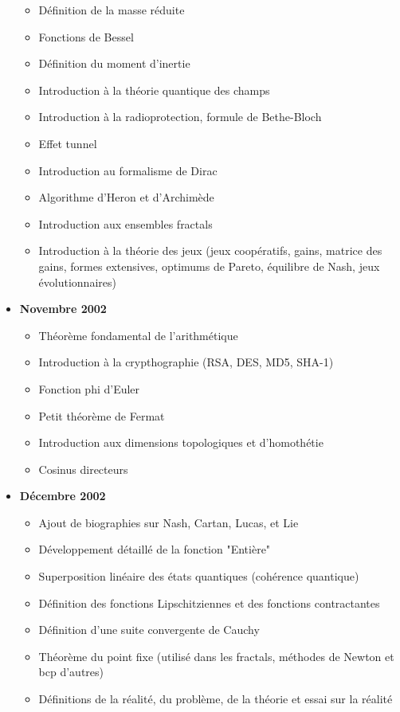 \begin{itemize}
\begin{itemize}[noitemsep]
				\item Définition de la masse réduite
				\item Fonctions de Bessel
				\item Définition du moment d'inertie
				\item Introduction à la théorie quantique des champs
				\item Introduction à la radioprotection, formule de Bethe-Bloch
				\item Effet tunnel
				\item Introduction au formalisme de Dirac
				\item Algorithme d'Heron et d'Archimède
				\item Introduction aux ensembles fractals
				\item Introduction à la théorie des jeux (jeux coopératifs, gains, matrice des gains, formes extensives, optimums de Pareto, équilibre de Nash, jeux évolutionnaires)
			\end{itemize}
			\item \textbf{Novembre 2002}
				\begin{itemize}[noitemsep]
				\item Théorème fondamental de l'arithmétique
				\item Introduction à la crypthographie (RSA, DES, MD5, SHA-1)
				\item Fonction phi d'Euler
				\item Petit théorème de Fermat
				\item Introduction aux dimensions topologiques et d'homothétie
				\item Cosinus directeurs
			\end{itemize}
			\item \textbf{Décembre 2002}
				\begin{itemize}[noitemsep]
				\item Ajout de biographies sur Nash, Cartan, Lucas, et Lie
				\item Développement détaillé de la fonction "Entière"
				\item Superposition linéaire des états quantiques (cohérence quantique)
				\item Définition des fonctions Lipschitziennes et des fonctions contractantes
				\item Définition d'une suite convergente de Cauchy
				\item Théorème du point fixe (utilisé dans les fractals, méthodes de Newton et bcp d'autres)
				\item Définitions de la réalité, du problème, de la théorie et essai sur la réalité

\end{itemize}
\end{itemize}
